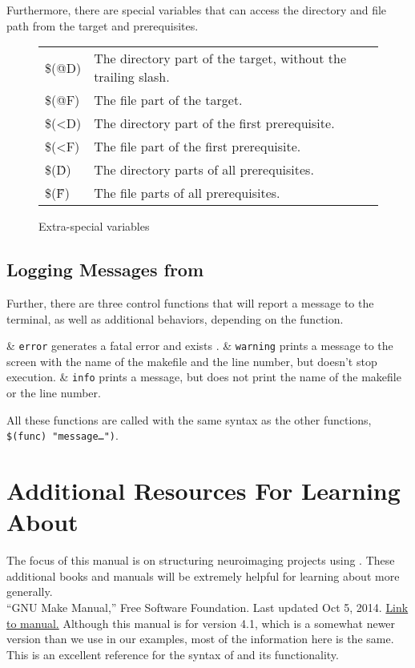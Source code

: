 Furthermore, there are special variables that can access the directory and file path from the target and prerequisites.

\begin{figure}[!ht]	
	\begin{tabularx}{\textwidth}{>{\ttfamily}l X}
		\$(@D)	& The directory part of the target, without the trailing slash. \\
		\$(@F)	& The file part of the target. \\
		\$(<D)	& The directory part of the first prerequisite. \\
		\$(<F)	& The file part of the first prerequisite. \\
		\$(\^D)	& The directory parts of all prerequisites. \\
		\$(\^F)	& The file parts of all prerequisites. 
	\end{tabularx}
	\caption{Extra-special variables}
\end{figure}


\subsection{Logging Messages from \maken}

Further, there are three \maken{} control functions that will report a message to the terminal, as well as additional behaviors, depending on the function.

\begin{easylist}[itemize]
	& \texttt{error} generates a fatal error and exists \maken{}.
	& \texttt{warning} prints a message to the screen with the name of the makefile and the line number, but doesn't stop execution.
	& \texttt{info} prints a message, but does not print the name of the makefile or the line number.
\end{easylist}

All these functions are called with the same syntax as the other functions, \texttt{\$({\color{blue}func}) "message\ldots")}.

\section{Additional Resources For Learning About \maken{}}
The focus of this manual is on structuring neuroimaging projects using \maken{}. These additional books and manuals will be extremely helpful for learning about \maken{} more generally. \\

``GNU Make Manual,'' Free Software Foundation. Last updated Oct 5, 2014. \href{http://www.gnu.org/software/make/manual/}{Link to manual.} Although this manual is for version 4.1, which is a somewhat newer version than we use in our examples, most of the information here is the same. This is an excellent reference for the syntax of \maken{} and its functionality. 
\\

